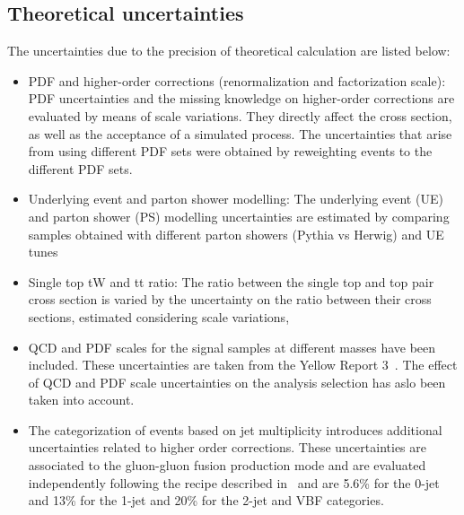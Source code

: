 \subsection*{ Theoretical uncertainties}
The uncertainties due to the precision of theoretical calculation are listed below: 
\begin{itemize}
\item PDF and higher-order corrections (renormalization and factorization scale): PDF
uncertainties and the missing knowledge on higher-order corrections are evaluated by
means of scale variations. They directly affect the cross section, as well as the acceptance
of a simulated process. The uncertainties that arise from using different PDF sets
were obtained by reweighting events to the different PDF sets.

\item Underlying event and parton shower modelling: The underlying event (UE) and
parton shower (PS) modelling uncertainties are estimated by comparing samples
obtained with different parton showers (Pythia vs Herwig) and UE tunes

\item Single top tW and tt ratio: The ratio between the single top and top pair cross section
is varied by the uncertainty on the ratio between their cross sections, estimated considering scale variations,

\item QCD and PDF scales for the signal samples at different masses have been included. These uncertainties are taken from the Yellow Report 3~\cite{Heinemeyer:2013tqa}.  The effect of QCD and PDF scale uncertainties on the analysis selection has aslo been taken into account.


\item The categorization of events based on jet multiplicity introduces additional uncertainties related to higher order corrections. These uncertainties are associated to the gluon-gluon fusion production mode and are evaluated independently following the recipe described in~\cite{Boughezal:2013oha} and are 5.6\% for the 0-jet and  13\% for the 1-jet and 20\% for the 2-jet and VBF categories.

\end{itemize}




